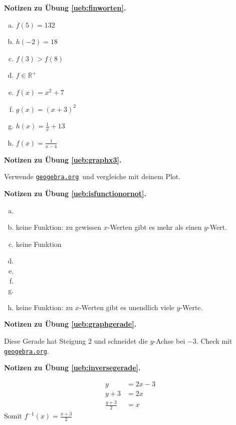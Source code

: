 \documentclass[%
11pt,%
twoside,%
titlepage,%
german,%
headsepline%
]{scrartcl}
\newcommand{\geogebralink}{\href{https://www.geogebra.org/calculator}{\texttt{geogebra.org}}}
\newcommand{\concatueb}[1]{ueb:#1}%
\newcommand{\concatlsg}[1]{lsg:#1}%
\newenvironment{lsg}[1]{%
    \par\noindent\textbf{Notizen zu Übung \ref{\concatueb{#1}}.}%
    \label{\concatlsg{#1}}
}{%
    \par%
}
\begin{document}
\begin{lsg}{finworten}
	\begin{enumerate}[a)]
		\item $f(5)=132$
		\item $h(-2)=18$
		\item $f(3)>f(8)$
		\item $f\in\mathbb{R}^{+}$
		\item $f(x)=x^{2}+7$
		\item $g(x)=(x+3)^{2}$
		\item $h(x)=\frac{1}{x}+13$
		\item $f(x)=\frac{1}{x-4}$
	\end{enumerate}
\end{lsg}
\begin{lsg}{graphx3}
	Verwende \geogebralink\   und vergleiche mit deinem Plot.
\end{lsg}
\begin{lsg}{isfunctionornot}
  \begin{enumerate}[a)]
    \item \checkmark
    \item keine Funktion: zu gewissen $x$-Werten gibt es mehr als einen $y$-Wert.
    \item keine Funktion
    \item \checkmark
    \item \checkmark
    \item \checkmark
    \item \checkmark
    \item keine Funktion: zu $x$-Werten gibt es unendlich viele $y$-Werte.
  \end{enumerate}
\end{lsg}

\begin{lsg}{graphgerade}
	Diese Gerade hat Steigung $2$ und schneidet die $y$-Achse bei $-3$. Check mit \geogebralink.
\end{lsg}

\begin{lsg}{inversegerade}
	\begin{align*}
	y &= 2x-3\tag{$+3$}\\
	y+3 &= 2x\tag{$\div2$}\\
	\frac{y+3}{2} &= x
	\end{align*}
Somit $f^{-1}(x)=\frac{x+3}{2}$
\end{lsg}
\end{document}
